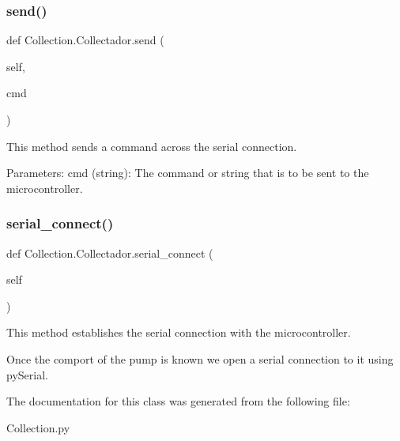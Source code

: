\subsubsection{\texorpdfstring{send()}{send()}}
{\footnotesize\ttfamily def Collection.\+Collectador.\+send (\begin{DoxyParamCaption}\item[{}]{self,  }\item[{}]{cmd }\end{DoxyParamCaption})}

\begin{DoxyVerb}This method sends a command across the serial connection.

Parameters:
    cmd (string): The command or string that is to be sent to the microcontroller.
\end{DoxyVerb}
 \mbox{\label{class_collection_1_1_collectador_a3d72795fd989947bee15cdd66f277815}} 
\subsubsection{\texorpdfstring{serial\_connect()}{serial\_connect()}}
{\footnotesize\ttfamily def Collection.\+Collectador.\+serial\+\_\+connect (\begin{DoxyParamCaption}\item[{}]{self }\end{DoxyParamCaption})}

\begin{DoxyVerb}This method establishes the serial connection with the microcontroller.

Once the comport of the pump is known we open a serial connection to it using pySerial.
\end{DoxyVerb}
 

The documentation for this class was generated from the following file\+:\begin{DoxyCompactItemize}
\item 
Collection.\+py\end{DoxyCompactItemize}

